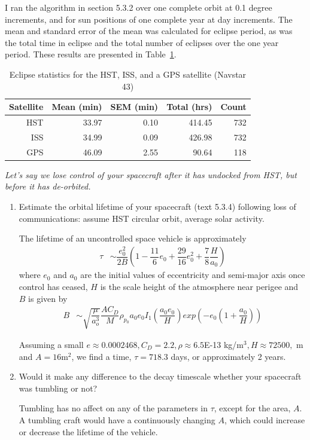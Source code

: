\documentclass[onecolumn,10pt]{jhwhw}
\begin{document}
I ran the algorithm in section 5.3.2 over one complete orbit at 0.1 degree increments, and for sun positions of one complete year at day increments. The mean and standard error of the mean was calculated for eclipse period, as was the total time in eclipse and the total number of eclipses over the one year period. These results are presented in Table~\ref{p2table}.

\begin{table}[h]
\begin{center}
\begin{tabular}{rrrrr}
\toprule
Satellite & Mean (min) & SEM (min) & Total (hrs) & Count \\
\midrule
HST & 33.97 & 0.10 & 414.45 & 732 \\
ISS & 34.99 & 0.09 & 426.98 & 732 \\
GPS & 46.09 & 2.55 &  90.64 & 118 \\
\bottomrule
\end{tabular}
\end{center}
\caption{Eclipse statistics for the HST, ISS, and a GPS satellite (Navstar 43)}
\label{p2table}
\end{table}

\clearpage

\problem{}
\textit{Let’s say we lose control of your spacecraft after it has undocked from HST, but before it has de-orbited.}
\begin{enumerate}
\itemsep0em
\item Estimate the orbital lifetime of your spacecraft (text 5.3.4) following loss of communications: assume HST circular orbit, average solar activity.

The lifetime of an uncontrolled space vehicle is approximately
\begin{align*}
\tau &\sim \dfrac{e_0^2}{2B} \left( 1 - \dfrac{11}{6}e_0 + \dfrac{29}{16}e_0^2 + \dfrac{7}{8} \dfrac{H}{a_0} \right)
\end{align*}
where $e_0$ and $a_0$ are the initial values of eccentricity and semi-major axis once control has ceased, $H$ is the scale height of the atmosphere near perigee and $B$ is given by
\begin{align*}
B &\sim \sqrt{\dfrac{\mu}{a_o^3}} \dfrac{A C_D}{M} \rho_{p_0} a_0 e_0 I_1 \left( \dfrac{a_0 e_0}{H} \right) exp \left(-e_0 \left(1 + \dfrac{a_0}{H} \right) \right)
\end{align*}

Assuming a small $e \approx 0.0002468, C_D = 2.2, \rho \approx 6.5$E-13 kg/m$^3, H \approx 72500,$ m and $A = 16$m$^2$, we find a time, $\tau = 718.3$ days, or approximately 2 years.


\item Would it make any difference to the decay timescale whether your spacecraft was tumbling or not?

Tumbling has no affect on any of the parameters in $\tau$, except for the area, $A$. A tumbling craft would have a continuously changing $A$, which could increase or decrease the lifetime of the vehicle.
\end{enumerate}
\end{document}
